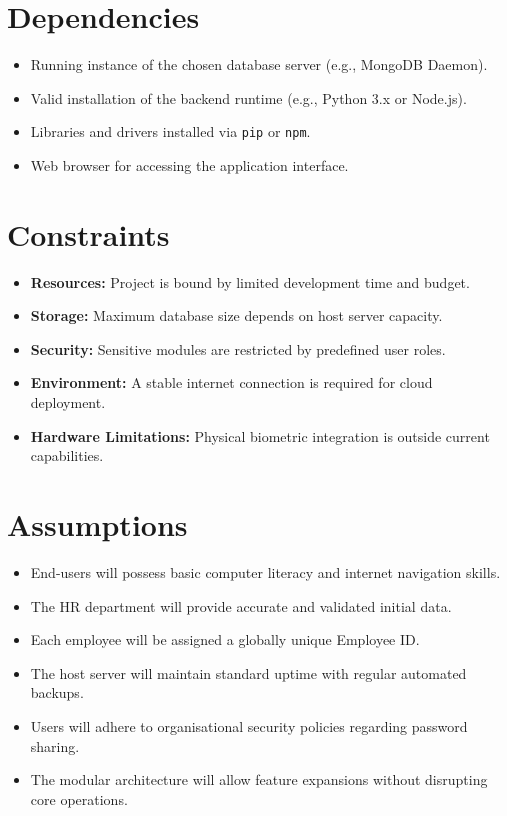 \documentclass[12pt,a4paper]{report}
\begin{document}
\section{Dependencies}
\begin{itemize}
  \item Running instance of the chosen database server (e.g., MongoDB Daemon).
  \item Valid installation of the backend runtime (e.g., Python 3.x or Node.js).
  \item Libraries and drivers installed via \texttt{pip} or \texttt{npm}.
  \item Web browser for accessing the application interface.
\end{itemize}

\section{Constraints}
\begin{itemize}
  \item \textbf{Resources:} Project is bound by limited development time and budget.
  \item \textbf{Storage:} Maximum database size depends on host server capacity.
  \item \textbf{Security:} Sensitive modules are restricted by predefined user roles.
  \item \textbf{Environment:} A stable internet connection is required for cloud deployment.
  \item \textbf{Hardware Limitations:} Physical biometric integration is outside current capabilities.
\end{itemize}

\section{Assumptions}
\begin{itemize}
  \item End-users will possess basic computer literacy and internet navigation skills.
  \item The HR department will provide accurate and validated initial data.
  \item Each employee will be assigned a globally unique Employee ID.
  \item The host server will maintain standard uptime with regular automated backups.
  \item Users will adhere to organisational security policies regarding password sharing.
  \item The modular architecture will allow feature expansions without disrupting core operations.
\end{itemize}
\end{document}
